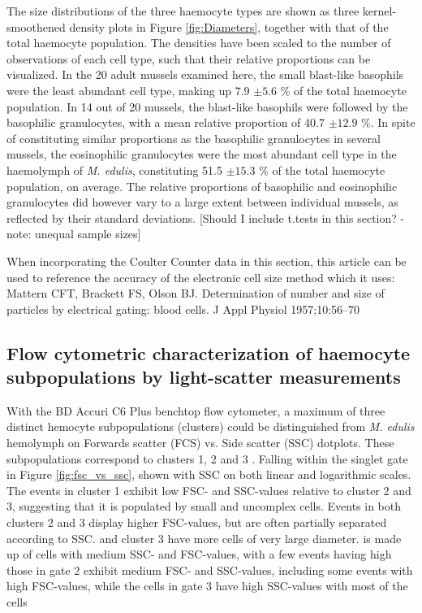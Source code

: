 The size distributions of the three haemocyte types are shown as three kernel-smoothened density plots in Figure \ref{fig:Diameters}, together with that of the total haemocyte population. The densities have been scaled to the number of observations of each cell type, such that their relative proportions can be visualized. In the 20 adult mussels examined here, the small blast-like basophils were the least abundant cell type, making up 7.9 $\pm{5.6}$ \% of the total haemocyte population. In 14 out of 20 mussels, the blast-like basophils were followed by the basophilic granulocytes, with a mean relative proportion of 40.7 $\pm{12.9}$ \%. In spite of constituting similar proportions as the basophilic granulocytes in several mussels, the eosinophilic granulocytes were the most abundant cell type in the haemolymph of \emph{M. edulis}, constituting 51.5 $\pm{15.3}$ \% of the total haemocyte population, on average. The relative proportions of basophilic and eosinophilic granulocytes did however vary to a large extent between individual mussels, as reflected by their standard deviations. [Should I include t.tests in this section? - note: unequal sample sizes]

When incorporating the Coulter Counter data in this section, this article can be used to reference the accuracy of the electronic cell size method which it uses: Mattern CFT, Brackett FS, Olson BJ. Determination of number and size of particles by electrical gating: blood cells. J Appl Physiol 1957;10:56–70


\subsection{Flow cytometric characterization of haemocyte subpopulations by light-scatter measurements}
With the BD Accuri C6 Plus benchtop flow cytometer, a maximum of three distinct hemocyte subpopulations (clusters) could be distinguished from \emph{M. edulis} hemolymph on Forwards scatter (FCS) vs. Side scatter (SSC) dotplots. These subpopulations correspond to clusters 1, 2 and 3 . Falling within the singlet gate in Figure \ref{fig:fsc_vs_ssc}, shown with SSC on both linear and logarithmic scales. The events in cluster 1 exhibit low FSC- and SSC-values relative to cluster 2 and 3, suggesting that it is populated by small and uncomplex cells. Events in both clusters 2 and 3 display higher FSC-values, but are often partially separated according to SSC.  and cluster 3 have more cells of very large diameter. is made up of cells with medium SSC- and FSC-values, with a few events having high those in gate 2 exhibit medium FSC- and SSC-values, including some events with high FSC-values, while the cells in gate 3 have high SSC-values with most of the cells

